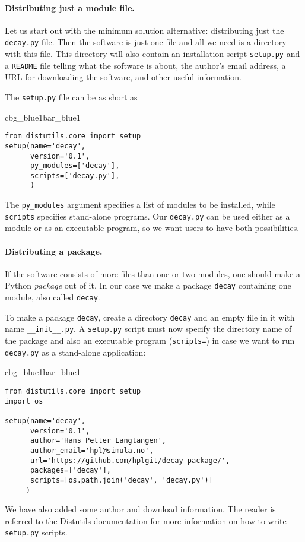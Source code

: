 \documentclass[graybox,sectrefs,envcountresetchap,open=right,final]{svmonodo}
\newenvironment{_pro_tight}[2]{
   \def\FrameCommand{\color{#2}\vrule width 1mm\normalcolor\colorbox{#1}}
   \FrameRule0.6pt\MakeFramed {\advance\hsize-2mm\FrameRestore}\vskip3mm}
   {\vskip0mm\endMakeFramed}
\newenvironment{pro}[2]{
\bgroup\rmfamily
\fboxsep=0mm\relax
\begin{_pro_tight}{#1}{#2}
\list{}{\parsep=-2mm\parskip=0mm\topsep=0pt\leftmargin=2mm
\rightmargin=2\leftmargin\leftmargin=4pt\relax}
\item\relax}
{\endlist\end{_pro_tight}\egroup}
\begin{document}
\paragraph{Distributing just a module file.}
Let us start out with the minimum solution alternative: distributing
just the \texttt{decay.py} file. Then the software is just one file and all
we need is a directory with this file. This directory will also
contain an installation script \texttt{setup.py} and a \texttt{README} file
telling what the software is about, the author's email address, a URL
for downloading the software, and other useful information.


The \texttt{setup.py} file can be as short as

\begin{pro}{cbg_blue1}{bar_blue1}\begin{Verbatim}[numbers=none,fontsize=\fontsize{9pt}{9pt},baselinestretch=0.95,xleftmargin=2mm]
from distutils.core import setup
setup(name='decay',
      version='0.1',
      py_modules=['decay'],
      scripts=['decay.py'],
      )
\end{Verbatim}
\end{pro}
\noindent
The \Verb!py_modules! argument specifies a list of modules to be installed, while
\texttt{scripts} specifies stand-alone programs. Our \texttt{decay.py} can be used
either as a module or as an executable program, so we want users to
have both possibilities.


\paragraph{Distributing a package.}
If the software consists of more files than one or two modules, one
should make a Python \emph{package} out of it. In our case we make a
package \texttt{decay} containing one module, also called \texttt{decay}.

To make a package \texttt{decay}, create a directory \texttt{decay} and an empty
file in it with name \Verb!__init__.py!.
A \texttt{setup.py} script must now specify the directory name of the package
and also an executable program (\texttt{scripts=})
in case we want to run \texttt{decay.py} as a stand-alone application:

\begin{pro}{cbg_blue1}{bar_blue1}\begin{Verbatim}[numbers=none,fontsize=\fontsize{9pt}{9pt},baselinestretch=0.95,xleftmargin=2mm]
from distutils.core import setup
import os

setup(name='decay',
      version='0.1',
      author='Hans Petter Langtangen',
      author_email='hpl@simula.no',
      url='https://github.com/hplgit/decay-package/',
      packages=['decay'],
      scripts=[os.path.join('decay', 'decay.py')]
     )
\end{Verbatim}
\end{pro}
\noindent
We have also added some author and download information.
The reader is referred to the \href{{https://docs.python.org/2/distutils/setupscript.html}}{Distutils documentation} for more information on how to
write \texttt{setup.py} scripts.
\end{document}
